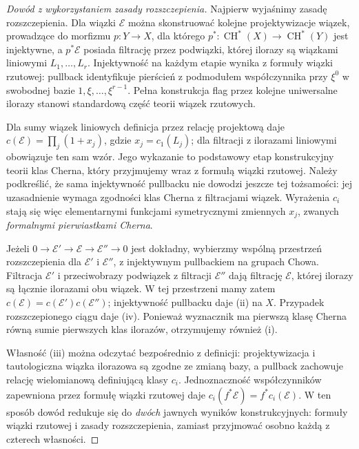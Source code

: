 \begin{proof}[Dowód z wykorzystaniem zasady rozszczepienia]
Najpierw wyjaśnimy zasadę rozszczepienia. Dla wiązki
$\mathcal E$ można skonstruować kolejne projektywizacje
wiązek, prowadzące do morfizmu $p:Y\to X$, dla którego
$p^*:\operatorname{CH}^*(X)\to\operatorname{CH}^*(Y)$
jest injektywne, a $p^*\mathcal E$ posiada filtrację
przez podwiązki, której ilorazy są wiązkami liniowymi
$L_1,\ldots,L_r$. Injektywność na każdym etapie
wynika z formuły wiązki rzutowej: pullback
identyfikuje pierścień z podmodułem współczynnika
przy $\xi^0$ w swobodnej bazie $1,\xi,\ldots,\xi^{r-1}$.
Pełna konstrukcja flag przez kolejne uniwersalne ilorazy
stanowi standardową część teorii wiązek rzutowych.

Dla sumy wiązek liniowych definicja przez relację
projektową daje
$c(\mathcal E)=\prod_j(1+x_j)$,
gdzie $x_j=c_1(L_j)$; dla filtracji z ilorazami liniowymi
obowiązuje ten sam wzór. Jego wykazanie to podstawowy
etap konstrukcyjny teorii klas Cherna, który
przyjmujemy wraz z formułą wiązki rzutowej.
Należy podkreślić, że sama injektywność pullbacku
nie dowodzi jeszcze tej tożsamości: jej uzasadnienie
wymaga zgodności klas Cherna z filtracjami wiązek.
Wyrażenia $c_i$ stają się więc elementarnymi funkcjami
symetrycznymi zmiennych $x_j$, zwanych
\emph{formalnymi pierwiastkami Cherna}.

Jeżeli $0\to\mathcal E'\to\mathcal E\to\mathcal E''\to0$
jest dokładny, wybierzmy wspólną przestrzeń rozszczepienia
dla $\mathcal E'$ i $\mathcal E''$, z injektywnym
pullbackiem na grupach Chowa. Filtracja
$\mathcal E'$ i przeciwobrazy podwiązek z filtracji
$\mathcal E''$ dają filtrację $\mathcal E$,
której ilorazy są łącznie ilorazami obu wiązek.
W tej przestrzeni mamy zatem
$c(\mathcal E)=c(\mathcal E')c(\mathcal E'')$;
injektywność pullbacku daje (ii) na $X$.
Przypadek rozszczepionego ciągu daje (iv).
Ponieważ wyznacznik ma pierwszą klasę Cherna równą
sumie pierwszych klas ilorazów, otrzymujemy również (i).

Własność (iii) można odczytać bezpośrednio z definicji:
projektywizacja i tautologiczna wiązka ilorazowa
są zgodne ze zmianą bazy, a pullback zachowuje relację
wielomianową definiującą klasy $c_i$. Jednoznaczność
współczynników zapewniona przez formułę wiązki rzutowej
daje $c_i(f^*\mathcal E)=f^*c_i(\mathcal E)$.
W ten sposób dowód redukuje się do \emph{dwóch} jawnych
wyników konstrukcyjnych: formuły wiązki rzutowej
i zasady rozszczepienia, zamiast przyjmować osobno
każdą z czterech własności.
\end{proof}

